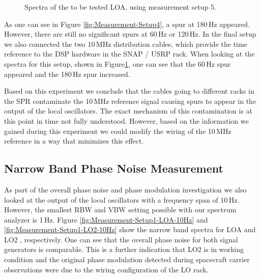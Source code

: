\documentclass[12pt]{article}
\begin{document}
%
%
\begin{figure}[ht!]
\caption{Spectra of the to be tested LOA, using measurement setup 5.}
\label{fig:Measurement-Setup5}
\end{figure}
%
As one can see in Figure \ref{fig:Measurement-Setup4}, a spur at 180\,Hz appeared.
However, there are still no significant spurs at 60\,Hz or 120\,Hz. In the final setup we also connected the two 10\,MHz distribution cables, which provide the time reference to the DSP hardware in the SNAP / USRP rack. When looking at the spectra for this setup, shown in Figure\ref{fig:Measurement-Setup5}, one can see that the 60\,Hz spur appeared and the 180\,Hz spur increased. 

Based on this experiment we conclude that the cables going to different racks in the SPR contaminate the 10\,MHz reference signal causing spurs to appear in the output of the local oscillators. The exact mechanism of this contamination is at this point in time not fully understood. However, based on the information we gained during this experiment we could modify the wiring of the 10\,MHz reference in a way that minimizes this effect. 

\subsection{Narrow Band Phase Noise Measurement}

As part of the overall phase noise and phase modulation investigation we also looked at the output of the local oscillators with a frequency span of 10\,Hz. However, the smallest RBW and VBW setting possible with our spectrum analyzer is 1\,Hz. Figure \ref{fig:Measurement-Setup1-LOA-10Hz} and \ref{fig:Measurement-Setup1-LO2-10Hz} show the narrow band spectra for LOA and LO2 , respectively. One can see that the overall phase noise for both signal generators is comparable. This is a further indication that LO2 is in working condition and the original phase modulation detected during spacecraft carrier observations were due to the wiring configuration of the LO rack.
\end{document}
